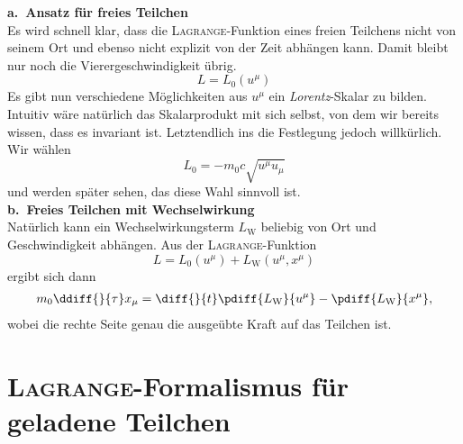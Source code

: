 \textbf{a.\ Ansatz für freies Teilchen}\\

Es wird schnell klar, dass die \textsc{Lagrange}-Funktion eines freien Teilchens nicht von seinem Ort und ebenso nicht explizit von der Zeit abhängen kann. Damit bleibt nur noch die Vierergeschwindigkeit übrig.
\begin{equation*}
L = L_0 \left(u^\mu \right)
\end{equation*}
Es gibt nun verschiedene Möglichkeiten aus $u^\mu$ ein \textit{Lorentz}-Skalar zu bilden. Intuitiv wäre natürlich das Skalarprodukt mit sich selbst, von dem wir bereits wissen, dass es invariant ist. Letztendlich ins die Festlegung jedoch willkürlich. Wir wählen
\begin{equation*}
L_0 = -m_0c\sqrt{u^\mu u_\mu}
\end{equation*}
und werden später sehen, das diese Wahl sinnvoll ist.\\

\textbf{b.\ Freies Teilchen mit Wechselwirkung}\\

Natürlich kann ein Wechselwirkungsterm $L_\text{W}$ beliebig von Ort und Geschwindigkeit abhängen. Aus der \textsc{Lagrange}-Funktion 
\begin{equation*}
L = L_0\left(u^\mu \right) + L_\text{W}\left(u^\mu,x^\mu\right)
\end{equation*}
ergibt sich dann
\begin{align*}
m_0 \ddiff{}{\tau} x_\mu = \diff{}{t}\pdiff{L_\text{W}}{u^\mu}-\pdiff{L_\text{W}}{x^\mu},
\end{align*}
wobei die rechte Seite genau die ausgeübte Kraft auf das Teilchen ist.

\section{\textsc{Lagrange}-Formalismus für geladene Teilchen}

